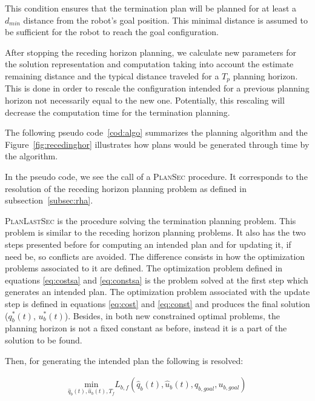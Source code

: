 \documentclass[eprint]{actapoly}
\begin{document}
This condition ensures that the termination plan will be planned for at least a 
$d_{min}$ distance from the robot's goal position.
This minimal distance is assumed to be sufficient for the robot to reach the 
goal configuration.

After stopping the receding horizon planning, we calculate new parameters for 
the solution representation and computation taking into
account the estimate remaining distance and the typical distance traveled
for a $T_p$ planning horizon.
This is done in order to rescale the configuration intended for a previous 
planning horizon not necessarily equal to the new one. Potentially, this
rescaling will decrease the computation time for the termination planning.

The following pseudo code~\ref{cod:algo} summarizes the planning algorithm    
and the Figure~\ref{fig:recedinghor} illustrates how plans would be generated
through time by the algorithm.

In the pseudo code, we see the call of a {\scshape PlanSec} procedure.
It corresponds to the resolution of the receding horizon planning 
problem as defined in subsection~\ref{subsec:rha}.

{\scshape PlanLastSec} is the procedure solving the termination planning
problem. This problem is similar to the receding horizon planning problems.
It also has the two steps presented before for computing an intended plan and
for updating it, if need be, so conflicts are avoided.
The difference consists in how the optimization problems associated to it are 
defined. The optimization problem defined in equations \ref{eq:costsa} and
\ref{eq:constsa} is the problem solved at the first step which generates an
intended plan.
The optimization
problem associated with the update step is defined in equations 
\ref{eq:cost} and \ref{eq:const} and produces the final solution ($q^*_b(t)$, $u^*_b(t)$).
Besides, in both new constrained optimal problems, the planning horizon is not
a fixed constant as before, instead it is a part of the solution to be found.

Then, for generating the intended plan the following is resolved:

\begin{align}\label{eq:costsa}
\underset{\hat{q}_b(t),\hat{u}_b(t),T_f}{\mathrm{min}} L_{b,f}(\hat{q}_b(t), \hat{u}_b(t), q_{b,goal},u_{b,goal})
\end{align}
\end{document}
